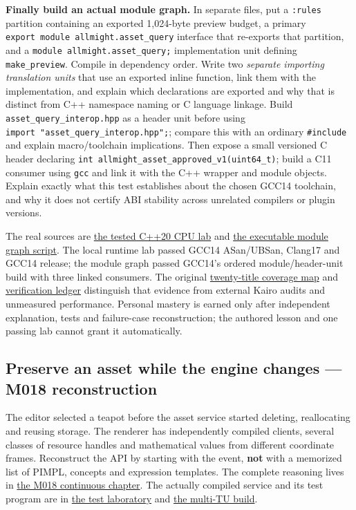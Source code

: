 \textbf{Finally build an actual module graph.} In separate files, put a \texttt{:rules} partition containing an exported 1,024-byte preview budget, a primary \texttt{export\ module\ allmight.asset\_query} interface that re-exports that partition, and a \texttt{module\ allmight.asset\_query;} implementation unit defining \texttt{make\_preview}. Compile in dependency order. Write two \emph{separate importing translation units} that use an exported inline function, link them with the implementation, and explain which declarations are exported and why that is distinct from C++ namespace naming or C language linkage. Build \texttt{asset\_query\_interop.hpp} as a header unit before using \texttt{import\ "asset\_query\_interop.hpp";}; compare this with an ordinary \texttt{\#include} and explain macro/toolchain implications. Then expose a small versioned C header declaring \texttt{int\ allmight\_asset\_approved\_v1(uint64\_t)}; build a C11 consumer using \texttt{gcc} and link it with the C++ wrapper and module objects. Explain exactly what this test establishes about the chosen GCC14 toolchain, and why it does not certify ABI stability across unrelated compilers or plugin versions.

The real sources are \href{tools/labs/asset_ranges_pmr_lab.cpp}{the tested C++20 CPU lab} and \href{tools/modules/build_module_lab.sh}{the executable module graph script}. The local runtime lab passed GCC14 ASan/UBSan, Clang17 and GCC14 release; the module graph passed GCC14's ordered module/header-unit build with three linked consumers. The original \hyperref[appendix-fd090d982a15]{twenty-title coverage map} and \hyperref[appendix-a103e7846d21]{verification ledger} distinguish that evidence from external Kairo audits and unmeasured performance. Personal mastery is earned only after independent explanation, tests and failure-case reconstruction; the authored lesson and one passing lab cannot grant it automatically.

\subsection{Preserve an asset while the engine changes --- M018 reconstruction}\label{preserve-an-asset-while-the-engine-changes-m018-reconstruction}

The editor selected a teapot before the asset service started deleting, reallocating and reusing storage. The renderer has independently compiled clients, several classes of resource handles and mathematical values from different coordinate frames. Reconstruct the API by starting with the event, \textbf{not} with a memorized list of PIMPL, concepts and expression templates. The complete reasoning lives in \href{Continuous\%20Notes/Computing\%20Foundations\%20-\%20From\%20Bits\%20to\%20C++\%20and\%20Systems\%20APIs\#A\%20registry\%20crosses\%20its\%20last\%20C++\%20boundary:\%20hidden\%20implementation,\%20typed\%20identity\%20and\%20measured\%20abstraction\%20cost}{the M018 continuous chapter}. The actually compiled service and its test program are in \href{tools/m018/m018_lab.cpp}{the test laboratory} and \href{tools/m018/build_m018_lab.sh}{the multi-TU build}.

